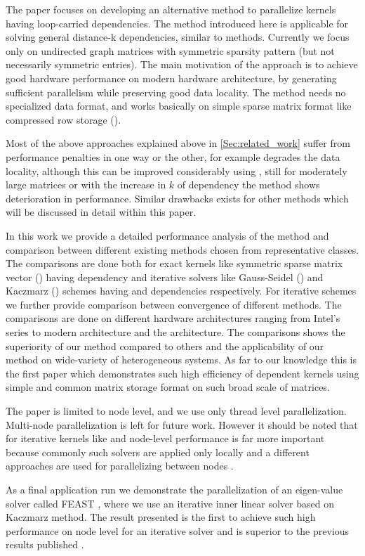 The paper focuses on developing an alternative method to parallelize kernels having loop-carried dependencies. The method introduced here is applicable for solving general distance-k dependencies, similar to \MCfull methods. Currently we focus only on undirected graph \ie matrices with symmetric sparsity pattern (but not necessarily symmetric entries). The main motivation of the approach is to achieve good hardware performance on modern hardware architecture, by generating sufficient parallelism while preserving good data locality. The method needs no specialized data format, and works basically on simple sparse matrix format like compressed row storage (\CRS).

Most of the above approaches explained above in \cref{Sec:related_work} suffer from performance penalties in one way or the other, for example \MCfull degrades the data locality, although this can be improved considerably using \ABMCfull, still for moderately large matrices or with the increase in $k$ of \DK dependency the method shows deterioration in performance. Similar drawbacks exists for other methods which will be discussed in detail within this paper.

In this work we provide a detailed performance analysis of the method and comparison between different existing methods chosen from representative classes. The comparisons are done both for exact kernels like symmetric sparse matrix vector (\SymmSpmv) having \DTWO dependency and iterative solvers like Gauss-Seidel (\GS) and Kaczmarz (\KACZ) schemes having \DONE and \DTWO dependencies respectively. For iterative schemes we further provide comparison between convergence of different methods. The comparisons are done on different hardware architectures ranging from Intel's \IVB series to modern \SKX architecture and the \AMD \EPY architecture. The comparisons shows the superiority of our method compared to others and the applicability of our method on wide-variety of heterogeneous systems. As far to our knowledge this is the first paper which demonstrates such high efficiency of \DTWO dependent kernels using simple and common \CRS matrix storage format on such broad scale of matrices.

The paper is limited to node level, and we use only thread level parallelization. Multi-node parallelization is left for future work. However it should be noted that for iterative kernels like \KACZ and \GS node-level performance is far more important because commonly such solvers are applied only locally and a different approaches are used for parallelizing between nodes \cite{hpcg,CARP}.


As a final application run we demonstrate the parallelization of an eigen-value solver called FEAST \cite{FEAST}, where we use an iterative inner linear solver based on Kaczmarz method. The result presented is the first to achieve such high performance on node level for an iterative solver and is superior to the previous results published \cite{feast_mc}.
